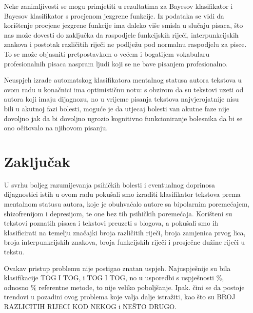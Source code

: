 \documentclass[10pt, a4paper]{article}
\begin{document}
Neke zanimljivosti se mogu primjetiti u rezultatima za Bayesov klasifikator i Bayesov klasifikator s procjenom jezgrene funkcije. Iz podataka se vidi da korištenje procjene jezgrene funkcije ima daleko više smisla u slučaju pisaca, što nas može dovesti do zaključka da raspodjele funkcijskih riječi, interpunkcijskih znakova i postotak različitih riječi ne podlježu pod normalnu raspodjelu za pisce. To se može objasniti pretpostavkom o većem i bogatijem vokabularu profesionalnih pisaca naspram ljudi koji se ne bave pisanjem profesionalno.

Neuspjeh izrade automatskog klasifikatora mentalnog statusa autora tekstova u ovom radu u konačnici ima optimističnu notu: s obzirom da su tekstovi uzeti od autora koji imaju dijagnozu, no u vrijeme pisanja tekstova najvjerojatnije nisu bili u akutnoj fazi bolesti, moguće je da utjecaj bolesti van akutne faze nije dovoljno jak da bi dovoljno ugrozio kognitivno funkcioniranje bolesnika da bi se ono očitovalo na njihovom pisanju. 




\section{Zaključak}

U svrhu boljeg razumijevanja psihičkih bolesti i eventualnog doprinosa dijagnostici istih u ovom radu pokušali smo izraditi klasifikator tekstova prema mentalnom statusu autora, koje je obuhvaćalo autore sa bipolarnim poremećajem, shizofrenijom i depresijom, te one bez tih psihičkih poremećaja. Korišteni su tekstovi poznatih pisaca i tekstovi preuzeti s blogova, a pokušali smo ih klasificirati na temelju značajki broja različitih riječi, broja zamjenica prvog lica, broja interpunkcijskih znakova, broja funkcijskih riječi i prosječne dužine riječi u tekstu. 

Ovakav pristup problemu nije postigao znatan uspjeh. Najuspješnije su bila klasifikacije TOG I TOG, i TOG I TOG, no u usporedbi s uspješnosti \%, odnosno \% referentne metode, to nije veliko poboljšanje. Ipak. čini se da postoje trendovi u pozadini ovog problema koje valja dalje istražiti, kao što su BROJ RAZLICITIH RIJECI KOD NEKOG i NEŠTO DRUGO. 
\end{document}
